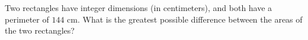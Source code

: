 Two rectangles have integer dimensions (in centimeters), and both have a perimeter of $144$ cm. What is the greatest possible difference between the areas of the two rectangles?

